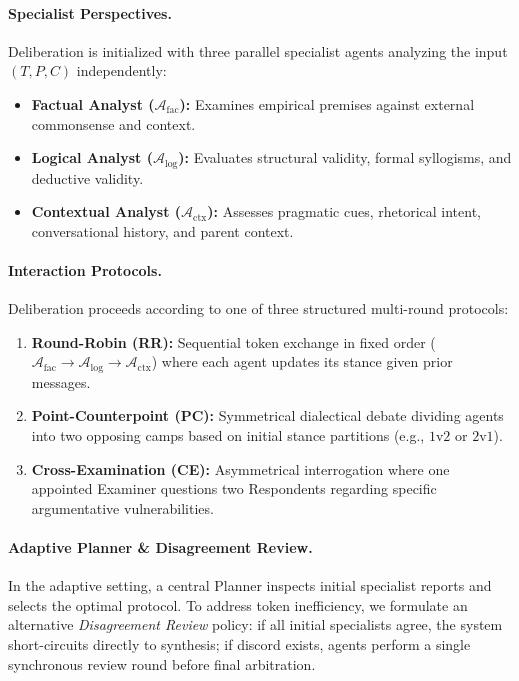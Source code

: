 \documentclass[11pt]{article}
\begin{document}
\paragraph{Specialist Perspectives.}
Deliberation is initialized with three parallel specialist agents analyzing the input $(T, P, C)$ independently:
\begin{itemize}[leftmargin=*,itemsep=1pt,topsep=2pt]
    \item \textbf{Factual Analyst ($\mathcal{A}_{\text{fac}}$):} Examines empirical premises against external commonsense and context.
    \item \textbf{Logical Analyst ($\mathcal{A}_{\text{log}}$):} Evaluates structural validity, formal syllogisms, and deductive validity.
    \item \textbf{Contextual Analyst ($\mathcal{A}_{\text{ctx}}$):} Assesses pragmatic cues, rhetorical intent, conversational history, and parent context.
\end{itemize}

\paragraph{Interaction Protocols.}
Deliberation proceeds according to one of three structured multi-round protocols:
\begin{enumerate}[leftmargin=*,itemsep=1pt,topsep=2pt]
    \item \textbf{Round-Robin (RR):} Sequential token exchange in fixed order ($\mathcal{A}_{\text{fac}} \to \mathcal{A}_{\text{log}} \to \mathcal{A}_{\text{ctx}}$) where each agent updates its stance given prior messages.
    \item \textbf{Point-Counterpoint (PC):} Symmetrical dialectical debate dividing agents into two opposing camps based on initial stance partitions (e.g., $1\text{v}2$ or $2\text{v}1$).
    \item \textbf{Cross-Examination (CE):} Asymmetrical interrogation where one appointed Examiner questions two Respondents regarding specific argumentative vulnerabilities.
\end{enumerate}

\paragraph{Adaptive Planner \& Disagreement Review.}
In the adaptive setting, a central Planner inspects initial specialist reports and selects the optimal protocol. To address token inefficiency, we formulate an alternative \textit{Disagreement Review} policy: if all initial specialists agree, the system short-circuits directly to synthesis; if discord exists, agents perform a single synchronous review round before final arbitration.
\end{document}

